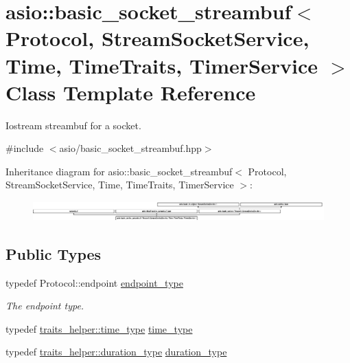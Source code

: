 \hypertarget{classasio_1_1basic__socket__streambuf}{}\section{asio\+:\+:basic\+\_\+socket\+\_\+streambuf$<$ Protocol, Stream\+Socket\+Service, Time, Time\+Traits, Timer\+Service $>$ Class Template Reference}
\label{classasio_1_1basic__socket__streambuf}


Iostream streambuf for a socket.  




{\ttfamily \#include $<$asio/basic\+\_\+socket\+\_\+streambuf.\+hpp$>$}

Inheritance diagram for asio\+:\+:basic\+\_\+socket\+\_\+streambuf$<$ Protocol, Stream\+Socket\+Service, Time, Time\+Traits, Timer\+Service $>$\+:\begin{figure}[H]
\begin{center}
\leavevmode
\includegraphics[height=0.736842cm]{classasio_1_1basic__socket__streambuf}
\end{center}
\end{figure}
\subsection*{Public Types}
\begin{DoxyCompactItemize}
\item 
typedef Protocol\+::endpoint \hyperlink{classasio_1_1basic__socket__streambuf_a89b46b0c3c210f854b355799821fd5db}{endpoint\+\_\+type}
\begin{DoxyCompactList}\small\item\em The endpoint type. \end{DoxyCompactList}\item 
typedef \hyperlink{structasio_1_1detail_1_1chrono__time__traits_a19c14f4d45a8b164d2ea4590eebc1c10}{traits\+\_\+helper\+::time\+\_\+type} \hyperlink{classasio_1_1basic__socket__streambuf_ac26395546c2d9decf0bcbc40b8f78adc}{time\+\_\+type}
\item 
typedef \hyperlink{structasio_1_1detail_1_1chrono__time__traits_a7f122a7cb603e7516bb6595016960775}{traits\+\_\+helper\+::duration\+\_\+type} \hyperlink{classasio_1_1basic__socket__streambuf_a9205273677adfb1e713637662efa6e12}{duration\+\_\+type}
\end{DoxyCompactItemize}
